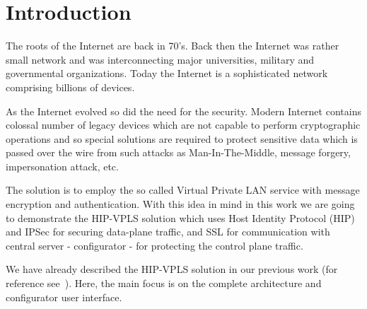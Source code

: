 \chapter{Introduction}

The roots of the Internet are back in 70's. Back then the Internet was rather 
small network and was interconnecting major universities, military and governmental
organizations. Today the Internet is a sophisticated network comprising billions 
of devices. 

As the Internet evolved so did the need for the security. Modern Internet 
contains colossal number of legacy devices which are not capable to perform 
cryptographic operations and so special solutions are required to protect 
sensitive data which is passed over the wire from such attacks as 
Man-In-The-Middle, message forgery, impersonation attack, etc.

The solution is to employ the so called Virtual Private LAN service with message
encryption and authentication. With this idea in mind in this work we are going 
to demonstrate the HIP-VPLS solution which uses Host Identity Protocol (HIP)
and IPSec for securing data-plane traffic, and SSL for communication with 
central server - configurator - for protecting the control plane traffic. 

We have already described the HIP-VPLS solution in our previous work (for reference
see~\cite{hipvplspython}). Here, the main focus is on the complete architecture and configurator
user interface.